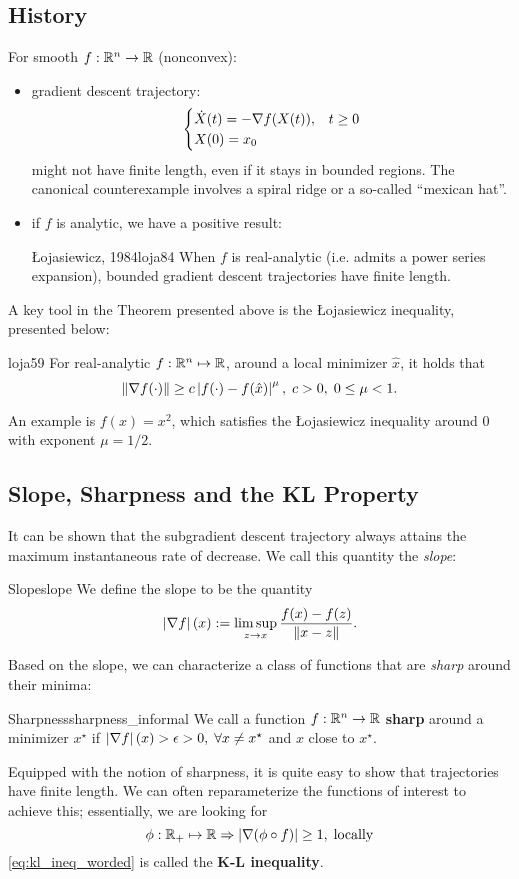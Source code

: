 \subsection{History}
For smooth $f: \mathbb{R}^n \to \mathbb{R}$ (nonconvex):
\begin{itemize}
	\item gradient descent trajectory:
		\[
			\begin{cases}
				\dot{X}(t) = -\nabla f(X(t)), & t \geq 0 \\
				X(0) = x_0 \\
			\end{cases}
		\]
		might not have finite length, even if it stays in bounded regions. The
		canonical counterexample involves a spiral ridge or a so-called
		``mexican hat''.
	\item if $f$ is analytic, we have a positive result:
		\begin{ctheorem}{{\L}ojasiewicz, 1984}{loja84}
			When $f$ is real-analytic (i.e. admits a power series expansion),
			bounded gradient descent trajectories have finite length.
		\end{ctheorem}
\end{itemize}
A key tool in the Theorem presented above is the {\L}ojasiewicz inequality,
presented below:
\begin{ctheorem}{\cite{Loja59}}{loja59}
	For real-analytic $f: \mathbb{R}^n \mapsto \mathbb{R}$, around a local minimizer
	$\hat{x}$, it holds that
	\[
		\left \| \nabla f(\cdot) \right \| \geq c \left| f(\cdot) - f(\hat{x}) \right|^{\mu}, \;
		c > 0, \; 0 \leq \mu < 1.
	\]
\end{ctheorem}
An example is $f(x) = x^2$, which satisfies the {\L}ojasiewicz inequality
around $0$ with exponent $\mu = 1/2$.

\subsection{Slope, Sharpness and the KL Property}
It can be shown that the subgradient descent trajectory always attains the
maximum instantaneous rate of decrease. We call this quantity the
\textit{slope}:
\begin{cdefinition}{Slope}{slope}
	We define the slope to be the quantity
	\[
		\left| \nabla f \right|(x) := \limsup_{z \to x} \frac{f(x) - f(z)}{\left \| x - z \right \|}.
	\]
\end{cdefinition}
Based on the slope, we can characterize a class of functions that are
\textit{sharp} around their minima:
\begin{cdefinition}{Sharpness}{sharpness_informal}
	We call a function $f: \mathbb{R}^n \to \mathbb{R}$ \textbf{sharp} around a minimizer
	$x^{\star}$ if $\left| \nabla f \right|(x) > \epsilon > 0, \; \forall x \neq
	x^{\star}$ and $x$ close to $x^{\star}$.
\end{cdefinition}
Equipped with the notion of sharpness, it is quite easy to show that
trajectories have finite length. We can often reparameterize the functions of
interest to achieve this; essentially, we are looking for
\begin{equation}
	\phi : \mathbb{R}_+ \mapsto \mathbb{R} \Rightarrow
	\left| \nabla(\phi \circ f) \right| \geq 1, \; \text{locally}
	\label{eq:kl_ineq_worded}
\end{equation}
\cref{eq:kl_ineq_worded} is called the \textbf{K-L inequality}.

